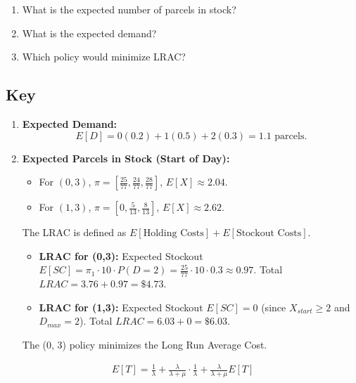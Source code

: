 \documentclass{report}
\begin{document}
\begin{enumerate}
	\item What is the expected number of parcels in stock? 
	\item What is the expected demand? 
	\item Which policy would minimize LRAC? 
\end{enumerate}

\subsection*{Key}

\begin{enumerate}
    \item \textbf{Expected Demand:} 
    \[ E[D] = 0(0.2) + 1(0.5) + 2(0.3) = 1.1 \text{ parcels.} \]

    \item \textbf{Expected Parcels in Stock (Start of Day):}
    \begin{itemize}
        \item For $(0,3)$, $\pi = [\frac{25}{77}, \frac{24}{77}, \frac{28}{77}]$, $E[X] \approx 2.04$.
        \item For $(1,3)$, $\pi = [0, \frac{5}{13}, \frac{8}{13}]$, $E[X] \approx 2.62$.
    \end{itemize}

    The LRAC is defined as $E[\text{Holding Costs}] + E[\text{Stockout Costs}]$.
    \begin{itemize}
        \item \textbf{LRAC for (0,3):} 
        Expected Stockout $E[SC] = \pi_1 \cdot 10 \cdot P(D=2) = \frac{25}{77} \cdot 10 \cdot 0.3 \approx 0.97$.
        Total $LRAC = 3.76 + 0.97 = \$4.73$.
        
        \item \textbf{LRAC for (1,3):} 
        Expected Stockout $E[SC] = 0$ (since $X_{start} \ge 2$ and $D_{max} = 2$).
        Total $LRAC = 6.03 + 0 = \$6.03$.
    \end{itemize}
The (0, 3) policy minimizes the Long Run Average Cost.
\end{enumerate}
\begin{align*}
	E[T] = \frac{1}{\lambda} + \frac{\lambda}{\lambda + \mu } \cdot \frac{1}{\lambda} + \frac{\lambda}{\lambda +\mu }E[T]
\end{align*}
\end{document}
